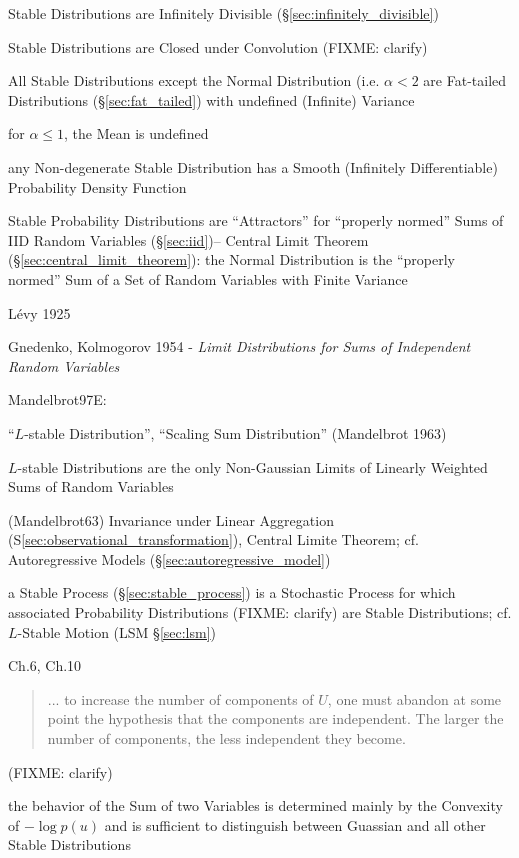 Stable Distributions are Infinitely Divisible (\S\ref{sec:infinitely_divisible})

Stable Distributions are Closed under Convolution (FIXME: clarify)

All Stable Distributions except the Normal Distribution (i.e. $\alpha < 2$ are
Fat-tailed Distributions (\S\ref{sec:fat_tailed}) with undefined (Infinite)
Variance

for $\alpha \leq 1$, the Mean is undefined

any Non-degenerate Stable Distribution has a Smooth (Infinitely Differentiable)
Probability Density Function

Stable Probability Distributions are ``Attractors'' for ``properly normed'' Sums
of IID Random Variables (\S\ref{sec:iid})-- Central Limit Theorem
(\S\ref{sec:central_limit_theorem}): the Normal Distribution is the ``properly
normed'' Sum of a Set of Random Variables with Finite Variance

L\'evy 1925

Gnedenko, Kolmogorov 1954 - \emph{Limit Distributions for Sums of Independent
Random Variables}

Mandelbrot97E:

``$L$-stable Distribution'', ``Scaling Sum Distribution'' (Mandelbrot 1963)

$L$-stable Distributions are the only Non-Gaussian Limits of Linearly Weighted
Sums of Random Variables

(Mandelbrot63) Invariance under Linear Aggregation
(S\ref{sec:observational_transformation}), Central Limite Theorem; cf.
Autoregressive Models (\S\ref{sec:autoregressive_model})

a Stable Process (\S\ref{sec:stable_process}) is a Stochastic Process for which
associated Probability Distributions (FIXME: clarify) are Stable Distributions;
cf. $L$-Stable Motion (LSM \S\ref{sec:lsm})

Ch.6, Ch.10

\begin{quote}
  ... to increase the number of components of $U$, one must abandon at some
  point the hypothesis that the components are independent. The larger the
  number of components, the less independent they become.
\end{quote}
(FIXME: clarify)

the behavior of the Sum of two Variables is determined mainly by the Convexity
of $-\log p(u)$ and is sufficient to distinguish between Guassian and all other
Stable Distributions

